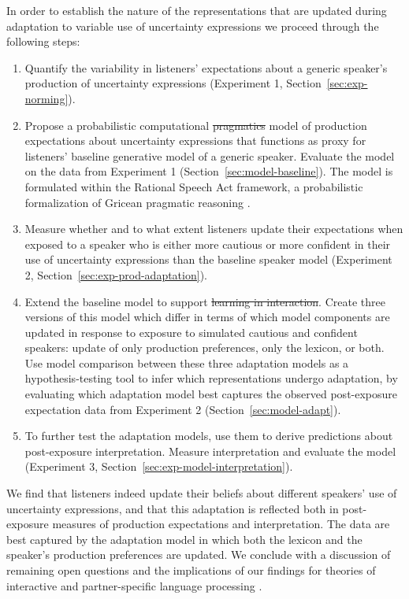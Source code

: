 \documentclass[man, floatsintext]{apa6}
\newcommand{\sectionref}[1]{Section~\ref{#1}}
\providecommand{\DIFadd}[1]{{\protect\color{blue}\uwave{#1}}} %
\providecommand{\DIFdel}[1]{{\protect\color{red}\sout{#1}}}                      %
\providecommand{\DIFaddbegin}{} %
\providecommand{\DIFaddend}{} %
\providecommand{\DIFdelbegin}{} %
\providecommand{\DIFdelend}{} %
\newcommand{\DIFscaledelfig}{0.5}
\newlength{\DIFdelgraphicswidth} %
\newlength{\DIFdelgraphicsheight} %
\newcommand{\DIFaddincludegraphics}[2][]{{\color{blue}\fbox{\DIFOincludegraphics[#1]{#2}}}} %
\newcommand{\DIFdelincludegraphics}[2][]{%
\sbox{\DIFdelgraphicsbox}{\DIFOincludegraphics[#1]{#2}}%
\settoboxwidth{\DIFdelgraphicswidth}{\DIFdelgraphicsbox} %
\settoboxtotalheight{\DIFdelgraphicsheight}{\DIFdelgraphicsbox} %
\scalebox{\DIFscaledelfig}{%
\parbox[b]{\DIFdelgraphicswidth}{\usebox{\DIFdelgraphicsbox}\\[-\baselineskip] \rule{\DIFdelgraphicswidth}{0em}}\llap{\resizebox{\DIFdelgraphicswidth}{\DIFdelgraphicsheight}{%
\setlength{\unitlength}{\DIFdelgraphicswidth}%
\begin{picture}(1,1)%
\thicklines\linethickness{2pt} %
{\color[rgb]{1,0,0}\put(0,0){\framebox(1,1){}}}%
{\color[rgb]{1,0,0}\put(0,0){\line( 1,1){1}}}%
{\color[rgb]{1,0,0}\put(0,1){\line(1,-1){1}}}%
\end{picture}%
}\hspace*{3pt}}} %
} %
\DeclareRobustCommand{\DIFaddbegin}{\DIFOaddbegin \let\includegraphics\DIFaddincludegraphics} %
\DeclareRobustCommand{\DIFaddend}{\DIFOaddend \let\includegraphics\DIFOincludegraphics} %
\DeclareRobustCommand{\DIFdelbegin}{\DIFOdelbegin \let\includegraphics\DIFdelincludegraphics} %
\DeclareRobustCommand{\DIFdelend}{\DIFOaddend \let\includegraphics\DIFOincludegraphics} %
\begin{document}
In order to establish the nature of the representations that are updated during adaptation to variable use of uncertainty expressions we proceed through the following steps:
\begin{enumerate}
	\item Quantify the variability in listeners' expectations about a generic speaker's production of uncertainty expressions (Experiment 1, \sectionref{sec:exp-norming}).
	\item Propose a probabilistic computational \DIFdelbegin \DIFdel{pragmatics }\DIFdelend model of production expectations about uncertainty expressions that functions as proxy for listeners' baseline generative model of a generic speaker. Evaluate the model on the data from Experiment 1 (\sectionref{sec:model-baseline}). The model is formulated within the Rational Speech Act framework, a probabilistic formalization of Gricean pragmatic reasoning   \parencite{Frank2012,Goodman2016,Franke2016}.
	\item Measure whether and to what extent listeners update their expectations when exposed to a speaker who is either more cautious or more confident in their use of uncertainty expressions than \DIFaddbegin \DIFadd{expected under }\DIFaddend the baseline speaker model (Experiment 2, \sectionref{sec:exp-prod-adaptation}).
	\item Extend the baseline model to support \DIFdelbegin \DIFdel{learning in interaction}\DIFdelend \DIFaddbegin \DIFadd{adaptation}\DIFaddend . Create three versions of this model which differ in terms of which model components are updated in response to exposure to simulated cautious and confident speakers: update of only production preferences, only the lexicon, or both. Use model comparison between these three adaptation models as a hypothesis-testing tool to infer which representations undergo adaptation, by evaluating which adaptation model best captures the observed post-exposure expectation data from Experiment 2 (\sectionref{sec:model-adapt}).
	\item To further test the adaptation models, use them to derive predictions about post-exposure interpretation. Measure interpretation and evaluate the model (Experiment 3, \sectionref{sec:exp-model-interpretation}).
\end{enumerate}

We find that listeners indeed update their beliefs about different  speakers' use of uncertainty expressions, and that this adaptation is reflected both in post-exposure measures of production expectations and interpretation. The data are best captured by the adaptation model in which both the lexicon and the speaker's production preferences are updated. We conclude with a discussion of remaining open questions and the implications of our findings for theories
of interactive  \parencite[e.g.,][]{Pickering2004,Pickering2013} and partner-specific language processing \parencite[e.g.,][]{Metzing2003,Horton2005,Horton2016}.
\end{document}
